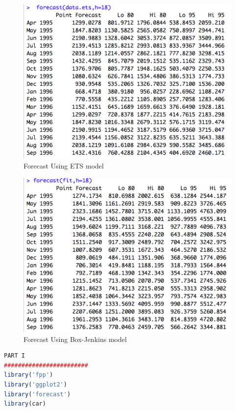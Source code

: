\documentclass[journal, a4paper]{IEEEtran}
\begin{document}
\newpage

\begin{appendix}


\begin{figure}[H]
\begin{center}
\includegraphics[scale=0.55]{fig1/forecast.png}
\caption{Forecast Using ETS model}
\label{fig1:forecast_ets}
\end{center}
\end{figure}


\begin{figure}[H]
\begin{center}
\includegraphics[scale=0.55]{fig1/forecast_box.png}
\caption{Forecast Using Box-Jenkins model}
\label{fig1:forecast_box}
\end{center}
\end{figure}
\newpage
\begin{lstlisting}[language=R,basicstyle=\tiny]
PART I
########################
library('fpp')
library('ggplot2')
library('forecast')
library(car)


\end{lstlisting}
\end{appendix}
\end{document}
